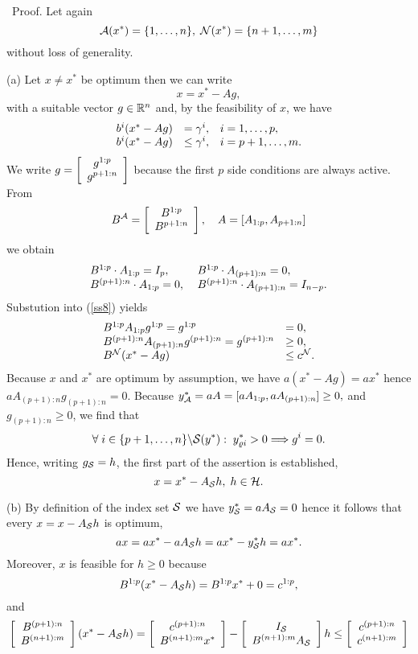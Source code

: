 %
\ Proof. Let again
\[
\A(x^*) = \{1, \ldots , n\}, \; \N(x^*) = \{n+1, \ldots , m\}
\]
without loss of generality.
\par
(a) Let $x \neq x^*$ be optimum then we can write
\[
x = x^* - Ag,
\]
with a suitable vector $g \in \Bbb{R}^n$ and, by the feasibility of $x$, we
have
%
\begin{equation} \label{ss8}
\ba{.}{lll}
b^i(x^* - Ag) &= \gamma ^i, &i = 1, \ldots , p,\\
b^i(x^* - Ag) &\leq \gamma ^i, & i = p+1, \ldots, m.
\ea{.}
\end{equation}
We write $\dis g = \ba{[}{c}g^{1:p}\\ g^{p+1:n} \ea{]}$
because the first $p$ side conditions are always active. From
%
\[
B^{\A} = \ba{[}{c}B^{1:p}\\B^{p+1:n}\ea{]}, \quad A = [A_{1:p}, A_{p+1:n}]
\]
we obtain
\[ \ba{.}{ll}
B^{1:p} \cdot A_{1:p} = I_p, & \; B^{1:p} \cdot A_{(p+1):n} = 0,\\
B^{(p+1):n} \cdot A_{1:p} = 0,   & \; B^{(p+1):n} \cdot A_{(p+1):n} = I_{n-p}.
\ea{.}
\]
Substution into (\ref{ss8}) yields
\[ \ba{.}{ll}
B^{1:p}A_{1:p}g^{1:p} = g^{1:p} &= 0,\\
B^{(p+1):n}A_{(p+1):n}g^{(p+1):n} = g^{(p+1):n} &\geq 0,\\
B^{\N}(x^* - Ag)&\leq c^{\N}.
\ea{.}
\]
%
Because $x$ and $x^*$ are optimum by assumption, we have $a(x^* - Ag) = ax^*$
hence $a A_{(p+1):n}g_{(p+1):n} = 0$.  Because $ y^*_{\A} = aA = [aA_{1:p},
aA_{(p+1):n}] \geq 0, $ and $g_{(p+1):n} \geq 0$, we find that
%
\[
\forall \; i \in \{p+1, \ldots, n\} \backslash {\cal S} (y^*): \; y^*_{\rho i}
> 0 \Longrightarrow g^i = 0.
\]
Hence, writing $g_{{\cal S} } = h$, the first part of the assertion is
established, \[
x = x^* - A_{{\cal S} }h, \; h \in {\cal H}.
\]
\par
(b) By definition of the index set ${\cal S} $ we have $y^*_{{\cal S} } =
aA_{{\cal S} } = 0$ hence it follows that every $x = x - A_{{\cal S} }h$ is
optimum, \[
ax = ax^* - a A_{{\cal S} }h = ax^* - y^*_{{\cal S} }h = ax^*.
\]
Moreover, $x$ is feasible for $h \geq 0$ because
\[
B^{1:p}(x^* - A_{{\cal S} }h) = B^{1:p}x^* + 0 = c^{1:p},
\]
and
\[
\ba{[}{c}B^{(p+1):n}\\B^{(n+1):m}\ea{]}(x^* - A_{{\cal S} }h)
= \ba{[}{c}c^{(p+1):n}\\B^{(n+1):m}x^* \ea{]} - \ba{[}{c}I_{{\cal S}
}\\B^{(n+1):m}A_{{\cal S} }\ea{]}h \leq
\ba{[}{c}c^{(p+1):n}\\c^{(n+1):m}\ea{]}
\]
